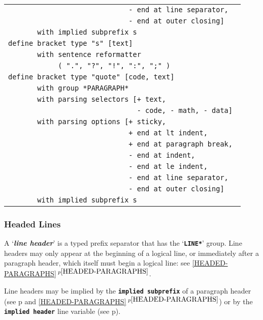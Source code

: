 \documentclass[12pt]{article}
\newcommand{\TT}[1]{{\tt \bfseries #1}}
\newcommand{\key}[1]{{\bf \em #1}\index{#1}}
\newcommand{\itemref}[1]{\ref{#1}$\,^{p\pageref{#1}}$}
\newcommand{\pagref}[1]{p\pageref{#1}}
\begin{document}
\begin{center}
\begin{tabular}{l}
\tt ~~~~~~~~~~~~~~~~~~~~~~~~~~~~~- end at line separator, \\
\tt ~~~~~~~~~~~~~~~~~~~~~~~~~~~~~- end at outer closing] \\
\tt ~~~~~~~with implied subprefix {s} \\
\tt define bracket type "s" [text] \\
\tt ~~~~~~~with sentence reformatter \\
\tt ~~~~~~~~~~~~( ".", "?", "!", ":", ";" ) \\
\tt define bracket type "quote" [code, text] \\
\tt ~~~~~~~with group *PARAGRAPH* \\
\tt ~~~~~~~with parsing selectors [+ text, \\
\tt ~~~~~~~~~~~~~~~~~~~~~~~~~~~~~~~- code, - math, - data] \\
\tt ~~~~~~~with parsing options [+ sticky, \\
\tt ~~~~~~~~~~~~~~~~~~~~~~~~~~~~~+ end at lt indent, \\
\tt ~~~~~~~~~~~~~~~~~~~~~~~~~~~~~+ end at paragraph break, \\
\tt ~~~~~~~~~~~~~~~~~~~~~~~~~~~~~- end at indent, \\
\tt ~~~~~~~~~~~~~~~~~~~~~~~~~~~~~- end at le indent, \\
\tt ~~~~~~~~~~~~~~~~~~~~~~~~~~~~~- end at line separator, \\
\tt ~~~~~~~~~~~~~~~~~~~~~~~~~~~~~- end at outer closing] \\
\tt ~~~~~~~with implied subprefix {s} \\
\end{tabular}

\end{center}


\subsubsection{Headed Lines}
\label{HEADED-LINES}

A `\key{line header}' is a typed prefix separator that has
the `\TT{*LINE*}' group.  Line headers may only
appear at the beginning of a logical line, or immediately
after a paragraph header, which itself must begin a logical
line: see \itemref{HEADED-PARAGRAPHS}.

Line headers may be implied by the \TT{implied subprefix}
of a paragraph header (see \pagref{IMPLIED-SUBPREFIX}
and \itemref{HEADED-PARAGRAPHS})
or by the \TT{implied header} line variable (see \pagref{IMPLIED-HEADER}).
\end{document}
